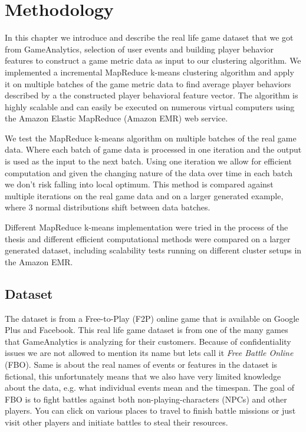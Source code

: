 
\chapter{Methodology} %
\label{Chapter4}
In this chapter we introduce and describe the real life game dataset that we got from GameAnalytics, selection of user events and building player behavior features to construct a game metric data as input to our clustering algorithm. We implemented a incremental MapReduce k-means clustering algorithm and apply it on multiple batches of the game metric data to find average player behaviors described by a the constructed player behavioral feature vector. The algorithm is highly scalable and can easily be executed on numerous virtual computers using the Amazon Elastic MapReduce (Amazon EMR) web service. 

We test the MapReduce k-means algorithm on multiple batches of the real game data. Where each batch of game data is processed in one iteration and the output is used as the input to the next batch. Using one iteration we allow for efficient computation and given the changing nature of the data over time in each batch we don't risk falling into local optimum. This method is compared against multiple iterations on the real game data and on a larger generated example, where 3 normal distributions shift between data batches.

Different MapReduce k-means implementation were tried in the process of the thesis and different efficient computational methods were compared on a larger generated dataset, including scalability tests running on different cluster setups in the Amazon EMR.

\section{Dataset}
The dataset is from a Free-to-Play (F2P) online game that is available on Google Plus and Facebook. This real life game dataset is from one of the many games that GameAnalytics is analyzing for their customers. Because of confidentiality issues we are not allowed to mention its name but lets call it \textit{Free Battle Online} (FBO). Same is about the real names of events or features in the dataset is fictional, this unfortunately means that we also have very limited knowledge about the data, e.g. what individual events mean and the timespan. The goal of FBO is to fight battles against both non-playing-characters (NPCs) and other players. You can click on various places to travel to finish battle missions or just visit other players and initiate battles to steal their resources.


